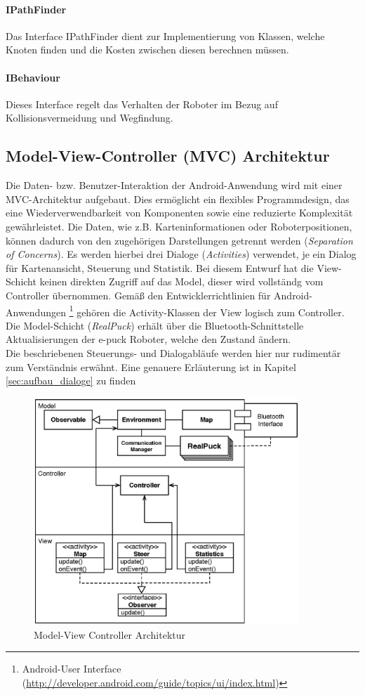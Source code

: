 \documentclass[10pt,a4paper]{article}
\begin{document}
			\paragraph*{IPathFinder}
			Das Interface IPathFinder dient zur Implementierung von Klassen, welche Knoten finden und die Kosten zwischen diesen berechnen müssen. 
			\paragraph*{IBehaviour}
			Dieses Interface regelt das Verhalten der Roboter im Bezug auf Kollisionsvermeidung und Wegfindung.


			\subsection{Model-View-Controller (MVC) Architektur}
				Die Daten- bzw. Benutzer-Interaktion der Android-Anwendung wird mit einer MVC-Architektur aufgebaut. Dies ermöglicht ein
				flexibles Programmdesign, das eine Wiederverwendbarkeit von Komponenten sowie eine reduzierte Komplexität gewährleistet.
				Die Daten, wie z.B. Karteninformationen oder Roboterpositionen, können dadurch von den zugehörigen Darstellungen getrennt werden
				(\textit{Separation of Concerns}). Es werden hierbei drei Dialoge (\textit{Activities}) verwendet, je ein Dialog für Kartenansicht, Steuerung und
				Statistik. Bei diesem Entwurf hat die View-Schicht keinen direkten Zugriff auf das Model, dieser wird vollständg vom
				Controller übernommen. Gemäß den Entwicklerrichtlinien für Android-Anwendungen 
				\footnote{Android-User Interface (\url{http://developer.android.com/guide/topics/ui/index.html})} gehören die Activity-Klassen der
				View logisch zum	Controller. Die Model-Schicht (\textit{RealPuck}) erhält über die Bluetooth-Schnittstelle Aktualisierungen der e-puck Roboter,
				welche den Zustand ändern.\\
				Die beschriebenen Steuerungs- und Dialogabläufe werden hier nur rudimentär zum Verständnis erwähnt. Eine genauere Erläuterung ist in
				Kapitel \ref{sec:aufbau_dialoge} zu finden
	  			\begin{figure}
					\centering
					\includegraphics[width=10cm]{images/android_mvc.eps}
  					\caption{Model-View Controller Architektur}
  					\label{fig:mvc}
 	 			\end{figure}					
\end{document}
